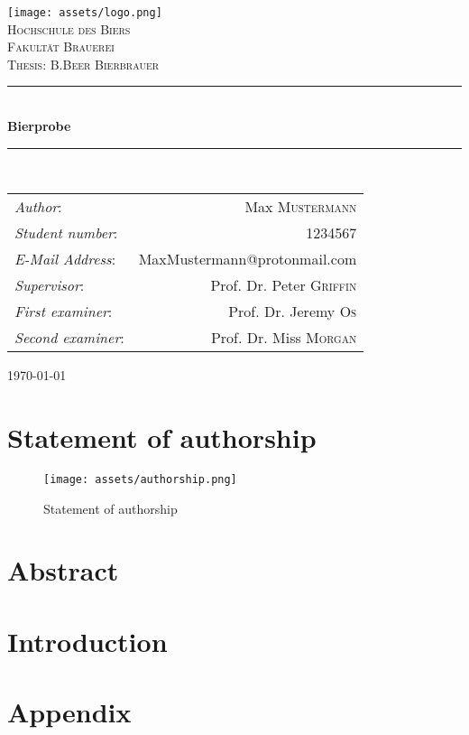 \documentclass[twoside, 12pt, openright]{book}
\begin{document}
\renewcommand{\headrulewidth}{0.0pt}
\frontmatter
\begin{titlepage}
    \newcommand{\HRule}{\rule{\linewidth}{0.5mm}}
    \center
    \texttt{[image: assets/logo.png]}\\[1cm] %
    \textsc{\LARGE Hochschule des Biers}\\[0.7cm]
    \textsc{\Large Fakultät Brauerei}\\[0.7cm]
    \textsc{\Large Thesis: B.Beer Bierbrauer}\\[0.7cm]
    \HRule \\[0.4cm]
    {\bfseries \LARGE Bierprobe}\\[0.4cm] %
    \HRule \\[1.5cm]
    \large
    \begin{tabular}{l r}
    \emph{Author}: & Max \textsc{Mustermann} \\ %

    \emph{Student number}: & 1234567 \\ %

    \emph{E-Mail Address}: & MaxMustermann@protonmail.com \\ %

    \emph{Supervisor}: & Prof. Dr. Peter \textsc{Griffin} \\ %

    \emph{First examiner}: & Prof. Dr. Jeremy \textsc{Os} \\ %

    \emph{Second examiner}: & Prof. Dr. Miss \textsc{Morgan} \\ %
\end{tabular}
    \vspace{2cm}
    {\large \today}\\[2cm]
    \vfill
    \end{titlepage}

\chapter*{Statement of authorship}
\begin{figure}[H]
    \centering
    \texttt{[image: assets/authorship.png]}
    \caption{Statement of authorship}
    \label{fig:statement}
\end{figure}
\newpage
\chapter*{Abstract}
\newpage
\tableofcontents
\renewcommand{\headrulewidth}{0.5pt}
\newpage
\mainmatter
\chapter{Introduction}
\newpage
\printbibliography
\newpage
\listoffigures
\newpage
\chapter{Appendix}
\newpage
\end{document}
